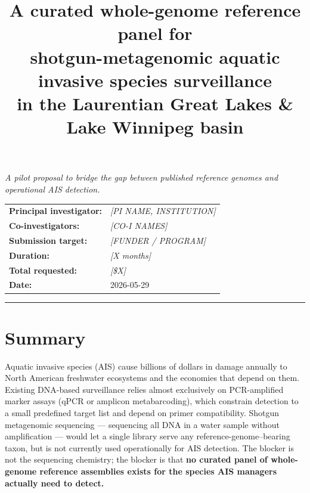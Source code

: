 \documentclass[11pt, letterpaper]{article}
\title{\vspace{-2em}\Large A curated whole-genome reference panel for\\shotgun-metagenomic aquatic invasive species surveillance\\in the Laurentian Great Lakes \& Lake Winnipeg basin}
\author{}
\date{}
\newcommand{\placeholder}[1]{\textcolor{mutedgray}{\textit{[#1]}}}
\begin{document}
\maketitle
\vspace{-3em}
\begin{center}
\textit{A pilot proposal to bridge the gap between published reference genomes and operational AIS detection.}
\end{center}

\vspace{1em}
\noindent
\begin{tabularx}{\textwidth}{lX}
\textbf{Principal investigator:} & \placeholder{PI NAME, INSTITUTION} \\
\textbf{Co-investigators:}       & \placeholder{CO-I NAMES} \\
\textbf{Submission target:}      & \placeholder{FUNDER / PROGRAM} \\
\textbf{Duration:}               & \placeholder{X months} \\
\textbf{Total requested:}        & \placeholder{\$X} \\
\textbf{Date:}                   & 2026-05-29 \\
\end{tabularx}

\vspace{1em}\hrule\vspace{1em}

\section*{Summary}

Aquatic invasive species (AIS) cause billions of dollars in damage annually to North American freshwater ecosystems and the economies that depend on them. Existing DNA-based surveillance relies almost exclusively on PCR-amplified marker assays (qPCR or amplicon metabarcoding), which constrain detection to a small predefined target list and depend on primer compatibility. Shotgun metagenomic sequencing --- sequencing all DNA in a water sample without amplification --- would let a single library serve any reference-genome--bearing taxon, but is not currently used operationally for AIS detection. The blocker is not the sequencing chemistry; the blocker is that \textbf{no curated panel of whole-genome reference assemblies exists for the species AIS managers actually need to detect.}
\end{document}
